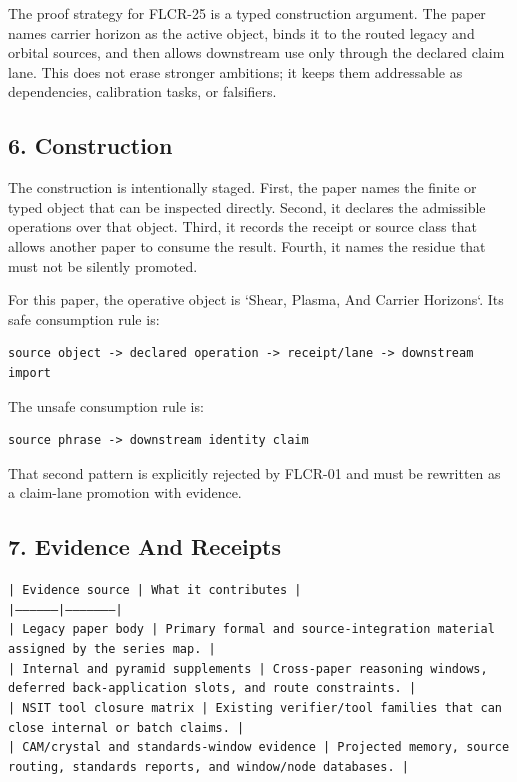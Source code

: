 \documentclass[11pt]{article}
\begin{document}
The proof strategy for FLCR-25 is a typed construction argument. The paper names carrier horizon as the active object, binds it to the routed legacy and orbital sources, and then allows downstream use only through the declared claim lane. This does not erase stronger ambitions; it keeps them addressable as dependencies, calibration tasks, or falsifiers.

\subsection*{6. Construction}

The construction is intentionally staged. First, the paper names the finite or
typed object that can be inspected directly. Second, it declares the admissible
operations over that object. Third, it records the receipt or source class that
allows another paper to consume the result. Fourth, it names the residue that
must not be silently promoted.

For this paper, the operative object is `Shear, Plasma, And Carrier Horizons`. Its safe consumption
rule is:

\begin{verbatim}
source object -> declared operation -> receipt/lane -> downstream import
\end{verbatim}

The unsafe consumption rule is:

\begin{verbatim}
source phrase -> downstream identity claim
\end{verbatim}

That second pattern is explicitly rejected by FLCR-01 and must be rewritten as
a claim-lane promotion with evidence.

\subsection*{7. Evidence And Receipts}

\noindent\texttt{| Evidence source | What it contributes |}\\
\noindent\texttt{|-----------------|---------------------|}\\
\noindent\texttt{| Legacy paper body | Primary formal and source-integration material assigned by the series map. |}\\
\noindent\texttt{| Internal and pyramid supplements | Cross-paper reasoning windows, deferred back-application slots, and route constraints. |}\\
\noindent\texttt{| NSIT tool closure matrix | Existing verifier/tool families that can close internal or batch claims. |}\\
\noindent\texttt{| CAM/crystal and standards-window evidence | Projected memory, source routing, standards reports, and window/node databases. |}\\
\end{document}
